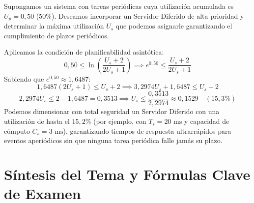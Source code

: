 \begin{ejemplo}
Supongamos un sistema con tareas periódicas cuya utilización acumulada es $U_p = 0{,}50$ ($50\%$). Deseamos incorporar un Servidor Diferido de alta prioridad y determinar la máxima utilización $U_s$ que podemos asignarle garantizando el cumplimiento de plazos periódicos.

Aplicamos la condición de planificabilidad asintótica:
$$0{,}50 \le \ln \left( \frac{U_s + 2}{2U_s + 1} \right) \implies e^{0{,}50} \le \frac{U_s + 2}{2U_s + 1}$$
Sabiendo que $e^{0{,}50} \approx 1{,}6487$:
$$1{,}6487 (2U_s + 1) \le U_s + 2 \implies 3{,}2974 U_s + 1{,}6487 \le U_s + 2$$
$$2{,}2974 U_s \le 2 - 1{,}6487 = 0{,}3513 \implies U_s \le \frac{0{,}3513}{2{,}2974} \approx 0{,}1529 \quad (15{,}3\%)$$
Podemos dimensionar con total seguridad un Servidor Diferido con una utilización de hasta el $15{,}2\%$ (por ejemplo, con $T_s = 20\text{ ms}$ y capacidad de cómputo $C_s = 3\text{ ms}$), garantizando tiempos de respuesta ultrarrápidos para eventos aperiódicos sin que ninguna tarea periódica falle jamás su plazo.
\end{ejemplo}

\section*{Síntesis del Tema y Fórmulas Clave de Examen}

